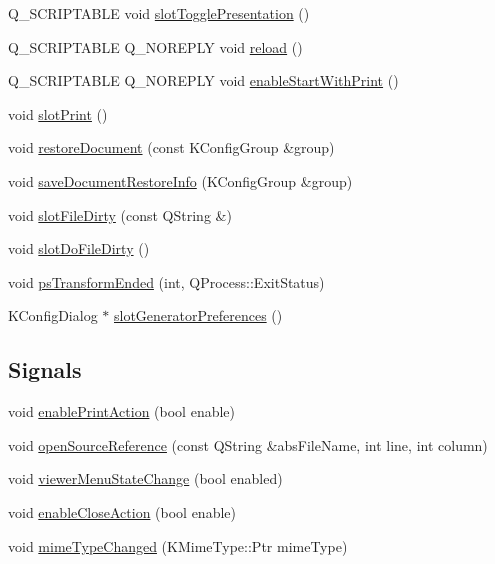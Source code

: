 \begin{DoxyCompactItemize}
\item 
Q\+\_\+\+S\+C\+R\+I\+P\+T\+A\+B\+L\+E void \hyperlink{classOkular_1_1Part_a87fce2962cd49b91e3ac3a72b334b973}{slot\+Toggle\+Presentation} ()
\item 
Q\+\_\+\+S\+C\+R\+I\+P\+T\+A\+B\+L\+E Q\+\_\+\+N\+O\+R\+E\+P\+L\+Y void \hyperlink{classOkular_1_1Part_a905418edb80aa0e4c7772a3478ed0cb4}{reload} ()
\item 
Q\+\_\+\+S\+C\+R\+I\+P\+T\+A\+B\+L\+E Q\+\_\+\+N\+O\+R\+E\+P\+L\+Y void \hyperlink{classOkular_1_1Part_a77f4aba125dd67c75e5f257a7b358c80}{enable\+Start\+With\+Print} ()
\item 
void \hyperlink{classOkular_1_1Part_ae4a132e628da6312254409b6d4813874}{slot\+Print} ()
\item 
void \hyperlink{classOkular_1_1Part_a8f3bacfa93babfc1cde8814147bbafb6}{restore\+Document} (const K\+Config\+Group \&group)
\item 
void \hyperlink{classOkular_1_1Part_a8bed743d32ebd4bdec45df9b2391aa76}{save\+Document\+Restore\+Info} (K\+Config\+Group \&group)
\item 
void \hyperlink{classOkular_1_1Part_a86e879053e139d53fc24b41daac5698e}{slot\+File\+Dirty} (const Q\+String \&)
\item 
void \hyperlink{classOkular_1_1Part_add3657962f39603d07fb63c74d5f57dc}{slot\+Do\+File\+Dirty} ()
\item 
void \hyperlink{classOkular_1_1Part_add53b33b9f4036d80ce401685678cac8}{ps\+Transform\+Ended} (int, Q\+Process\+::\+Exit\+Status)
\item 
K\+Config\+Dialog $\ast$ \hyperlink{classOkular_1_1Part_a749c93a23ce59b9ea69b883f37eef9c8}{slot\+Generator\+Preferences} ()
\end{DoxyCompactItemize}
\subsection*{Signals}
\begin{DoxyCompactItemize}
\item 
void \hyperlink{classOkular_1_1Part_a8b19626e9fcd036e065b71f8cc77d65e}{enable\+Print\+Action} (bool enable)
\item 
void \hyperlink{classOkular_1_1Part_a83d6768f5f87144b4578042866bfa229}{open\+Source\+Reference} (const Q\+String \&abs\+File\+Name, int line, int column)
\item 
void \hyperlink{classOkular_1_1Part_aac8c46288e6db5549d51e0bd2ce38d43}{viewer\+Menu\+State\+Change} (bool enabled)
\item 
void \hyperlink{classOkular_1_1Part_a7cdc8bd152358129c9033f8ae57ac022}{enable\+Close\+Action} (bool enable)
\item 
void \hyperlink{classOkular_1_1Part_a65d7234673882ed0e6d6d26c189be043}{mime\+Type\+Changed} (K\+Mime\+Type\+::\+Ptr mime\+Type)
\end{DoxyCompactItemize}
